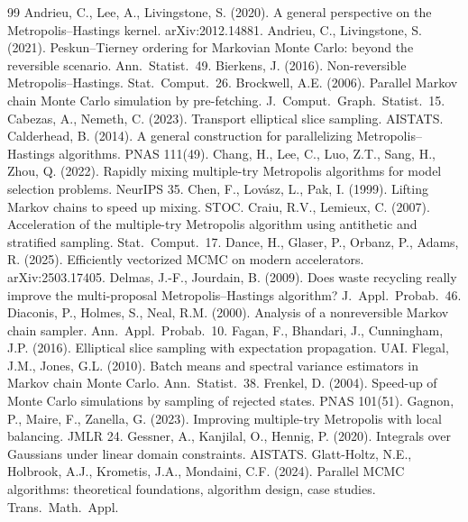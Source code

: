 \documentclass[11pt,a4paper]{article}
\theoremstyle{remark}
\begin{document}
\begin{thebibliography}{99}\small
{} Andrieu, C., Lee, A., Livingstone, S. (2020). A general perspective on the Metropolis--Hastings kernel. arXiv:2012.14881.
 Andrieu, C., Livingstone, S. (2021). Peskun--Tierney ordering for Markovian Monte Carlo: beyond the reversible scenario. Ann.\ Statist.\ 49.
 Bierkens, J. (2016). Non-reversible Metropolis--Hastings. Stat.\ Comput.\ 26.
 Brockwell, A.E. (2006). Parallel Markov chain Monte Carlo simulation by pre-fetching. J.\ Comput.\ Graph.\ Statist.\ 15.
 Cabezas, A., Nemeth, C. (2023). Transport elliptical slice sampling. AISTATS.
 Calderhead, B. (2014). A general construction for parallelizing Metropolis--Hastings algorithms. PNAS 111(49).
 Chang, H., Lee, C., Luo, Z.T., Sang, H., Zhou, Q. (2022). Rapidly mixing multiple-try Metropolis algorithms for model selection problems. NeurIPS 35.
 Chen, F., Lov\'asz, L., Pak, I. (1999). Lifting Markov chains to speed up mixing. STOC.
 Craiu, R.V., Lemieux, C. (2007). Acceleration of the multiple-try Metropolis algorithm using antithetic and stratified sampling. Stat.\ Comput.\ 17.
 Dance, H., Glaser, P., Orbanz, P., Adams, R. (2025). Efficiently vectorized MCMC on modern accelerators. arXiv:2503.17405.
 Delmas, J.-F., Jourdain, B. (2009). Does waste recycling really improve the multi-proposal Metropolis--Hastings algorithm? J.\ Appl.\ Probab.\ 46.
 Diaconis, P., Holmes, S., Neal, R.M. (2000). Analysis of a nonreversible Markov chain sampler. Ann.\ Appl.\ Probab.\ 10.
 Fagan, F., Bhandari, J., Cunningham, J.P. (2016). Elliptical slice sampling with expectation propagation. UAI.
 Flegal, J.M., Jones, G.L. (2010). Batch means and spectral variance estimators in Markov chain Monte Carlo. Ann.\ Statist.\ 38.
 Frenkel, D. (2004). Speed-up of Monte Carlo simulations by sampling of rejected states. PNAS 101(51).
 Gagnon, P., Maire, F., Zanella, G. (2023). Improving multiple-try Metropolis with local balancing. JMLR 24.
 Gessner, A., Kanjilal, O., Hennig, P. (2020). Integrals over Gaussians under linear domain constraints. AISTATS.
 Glatt-Holtz, N.E., Holbrook, A.J., Krometis, J.A., Mondaini, C.F. (2024). Parallel MCMC algorithms: theoretical foundations, algorithm design, case studies. Trans.\ Math.\ Appl.

\end{thebibliography}
\end{document}
